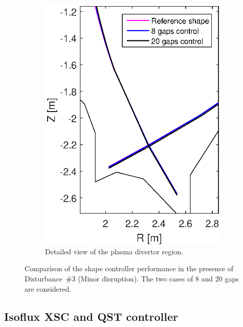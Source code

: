 \begin{figure}[h]
\begin{subfigure}[b]{0.32\textwidth}
		\includegraphics[width=\textwidth]{Chp3/zoom_Ref_20gaps_8gaps_minor_strike_2.eps} 
		\caption{Detailed view of the plasma divertor region. \label{figure:minor_strike}}
	\end{subfigure}
	
	
	\caption{ Comparison of the shape controller performance in the presence of Disturbance~\#3 (Minor disruption). The two cases of 8 and 20 gaps are considered.}
	\label{figure:minor}
\end{figure}








\subsection{Isoflux XSC and QST controller }

